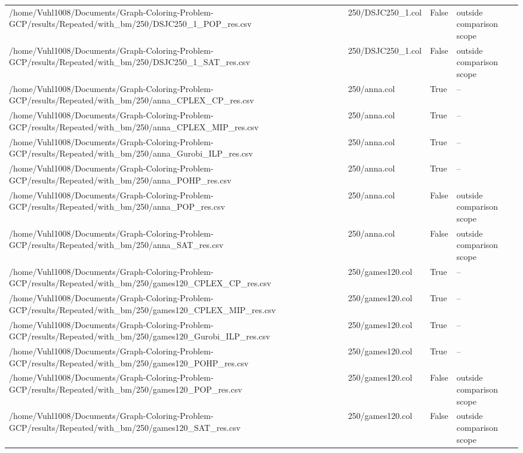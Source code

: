 \begin{table}[htbp]
\begin{tabular}{llll}
/home/Vuhl1008/Documents/Graph-Coloring-Problem-GCP/results/Repeated/with\_bm/250/DSJC250\_1\_POP\_res.csv & 250/DSJC250\_1.col & False & outside comparison scope \\
/home/Vuhl1008/Documents/Graph-Coloring-Problem-GCP/results/Repeated/with\_bm/250/DSJC250\_1\_SAT\_res.csv & 250/DSJC250\_1.col & False & outside comparison scope \\
/home/Vuhl1008/Documents/Graph-Coloring-Problem-GCP/results/Repeated/with\_bm/250/anna\_CPLEX\_CP\_res.csv & 250/anna.col & True & -- \\
/home/Vuhl1008/Documents/Graph-Coloring-Problem-GCP/results/Repeated/with\_bm/250/anna\_CPLEX\_MIP\_res.csv & 250/anna.col & True & -- \\
/home/Vuhl1008/Documents/Graph-Coloring-Problem-GCP/results/Repeated/with\_bm/250/anna\_Gurobi\_ILP\_res.csv & 250/anna.col & True & -- \\
/home/Vuhl1008/Documents/Graph-Coloring-Problem-GCP/results/Repeated/with\_bm/250/anna\_POHP\_res.csv & 250/anna.col & True & -- \\
/home/Vuhl1008/Documents/Graph-Coloring-Problem-GCP/results/Repeated/with\_bm/250/anna\_POP\_res.csv & 250/anna.col & False & outside comparison scope \\
/home/Vuhl1008/Documents/Graph-Coloring-Problem-GCP/results/Repeated/with\_bm/250/anna\_SAT\_res.csv & 250/anna.col & False & outside comparison scope \\
/home/Vuhl1008/Documents/Graph-Coloring-Problem-GCP/results/Repeated/with\_bm/250/games120\_CPLEX\_CP\_res.csv & 250/games120.col & True & -- \\
/home/Vuhl1008/Documents/Graph-Coloring-Problem-GCP/results/Repeated/with\_bm/250/games120\_CPLEX\_MIP\_res.csv & 250/games120.col & True & -- \\
/home/Vuhl1008/Documents/Graph-Coloring-Problem-GCP/results/Repeated/with\_bm/250/games120\_Gurobi\_ILP\_res.csv & 250/games120.col & True & -- \\
/home/Vuhl1008/Documents/Graph-Coloring-Problem-GCP/results/Repeated/with\_bm/250/games120\_POHP\_res.csv & 250/games120.col & True & -- \\
/home/Vuhl1008/Documents/Graph-Coloring-Problem-GCP/results/Repeated/with\_bm/250/games120\_POP\_res.csv & 250/games120.col & False & outside comparison scope \\
/home/Vuhl1008/Documents/Graph-Coloring-Problem-GCP/results/Repeated/with\_bm/250/games120\_SAT\_res.csv & 250/games120.col & False & outside comparison scope \\

\end{tabular}
\end{table}
